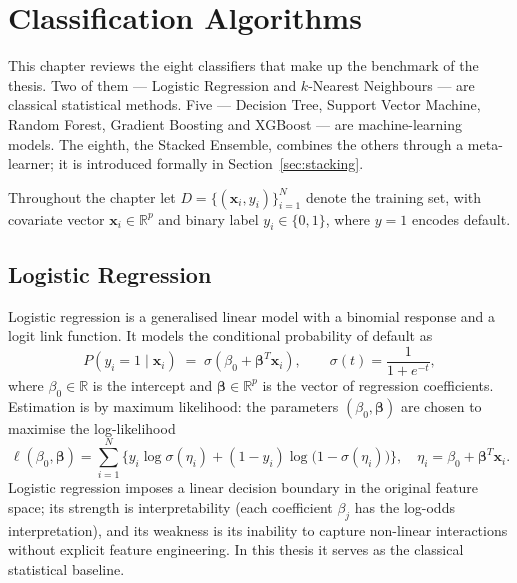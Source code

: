 \chapter{Classification Algorithms}\doublespacing
\label{Chapter2}

This chapter reviews the eight classifiers that make up the benchmark
of the thesis. Two of them --- Logistic Regression and $k$-Nearest
Neighbours --- are classical statistical methods. Five --- Decision
Tree, Support Vector Machine, Random Forest, Gradient Boosting and
XGBoost --- are machine-learning models. The eighth, the Stacked
Ensemble, combines the others through a meta-learner; it is
introduced formally in Section~\ref{sec:stacking}.

Throughout the chapter let
$D=\{(\mathbf{x}_i,y_i)\}_{i=1}^{N}$ denote the training set, with
covariate vector $\mathbf{x}_i\in\mathbb{R}^{p}$ and binary label
$y_i\in\{0,1\}$, where $y=1$ encodes default.

\section{Logistic Regression}
\label{sec:lr}

Logistic regression is a generalised linear model with a binomial
response and a logit link function. It models the conditional
probability of default as
\begin{equation}
P(y_i=1\mid \mathbf{x}_i)
\;=\;
\sigma\!\left(\beta_0 + \boldsymbol{\beta}^{T}\mathbf{x}_i\right),
\qquad
\sigma(t)=\frac{1}{1+e^{-t}},
\tag{2.1}
\label{eq:lr}
\end{equation}
where $\beta_0\in\mathbb{R}$ is the intercept and
$\boldsymbol{\beta}\in\mathbb{R}^{p}$ is the vector of regression
coefficients. Estimation is by maximum likelihood: the parameters
$(\beta_0,\boldsymbol{\beta})$ are chosen to maximise the
log-likelihood
\begin{equation}
\ell(\beta_0,\boldsymbol{\beta})
=
\sum_{i=1}^{N}
\bigl\{
y_i\log\sigma(\eta_i)
+
(1-y_i)\log\bigl(1-\sigma(\eta_i)\bigr)
\bigr\},
\quad
\eta_i = \beta_0 + \boldsymbol{\beta}^{T}\mathbf{x}_i.
\tag{2.2}
\label{eq:lr-ll}
\end{equation}
Logistic regression imposes a linear decision boundary in the original
feature space; its strength is interpretability (each coefficient
$\beta_j$ has the log-odds interpretation), and its weakness is its
inability to capture non-linear interactions without explicit feature
engineering. In this thesis it serves as the classical statistical
baseline.

